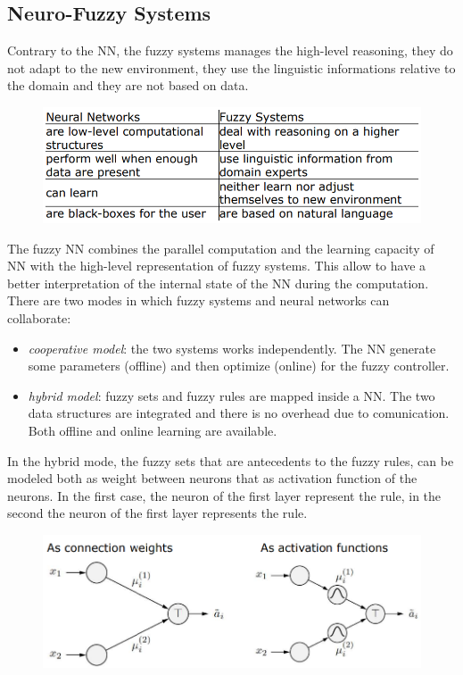 \documentclass{article}
\begin{document}
\subsection{Neuro-Fuzzy Systems}
Contrary to the NN, the fuzzy systems manages the high-level reasoning, they do not adapt to the new
environment, they use the linguistic informations relative to the domain and they are not based on
data.
\begin{figure}[H]
    \centering
    \includegraphics[scale=0.5]{images/nnvsfuzzy.png}
\end{figure}
The fuzzy NN combines the parallel computation and the learning capacity of NN with the
high-level representation of fuzzy systems. This allow to have a better interpretation of the internal
state of the NN during the computation. There are two modes in which fuzzy systems and neural networks
can collaborate:
\begin{itemize}
    \item \textit{cooperative model}: the two systems works independently. The NN generate some parameters
          (offline) and then optimize (online) for the fuzzy controller.
    \item \textit{hybrid model}: fuzzy sets and fuzzy rules are mapped inside a NN. The two data
          structures are integrated and there is no overhead due to comunication. Both offline and online
          learning are available.
\end{itemize}
In the hybrid mode, the fuzzy sets that are antecedents to the fuzzy rules, can be modeled both as weight
between neurons that as activation function of the neurons. In the first case, the neuron of the first
layer represent the rule, in the second the neuron of the first layer represents the rule.
\begin{figure}[H]
    \centering
    \includegraphics[scale=0.5]{images/nnfzconnactiv.png}
\end{figure}
\end{document}
